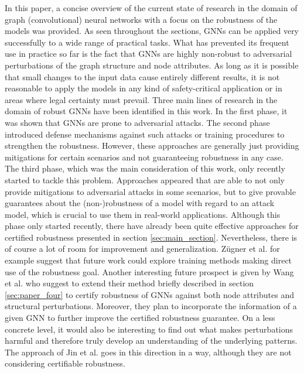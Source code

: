 \documentclass[a4paper,preprint]{sig-alternate}
\begin{document}
In this paper, a concise overview of the current state of research in the domain of graph (convolutional) neural networks with a focus on the robustness 
of the models was provided. As seen throughout the sections, GNNs can be applied very successfully to a wide range of practical tasks.
What has prevented its frequent use in practice so far is the fact that GNNs are highly non-robust to adversarial perturbations of the graph structure
and node attributes. As long as it is possible that small changes to the input data cause entirely different results, it is not reasonable to
apply the models in any kind of safety-critical application or in areas where legal certainty must prevail.\newline
Three main lines of research in the domain of robust GNNs have been identified in this work. In the first phase, it was shown that GNNs are prone to adversarial attacks.
The second phase introduced defense mechanisms against such attacks or training procedures to strengthen the robustness. However, these approaches
are generally just providing mitigations for certain scenarios and not guaranteeing robustness in any case.
The third phase, which was the main consideration of this work, only recently started to tackle this problem. 
Approaches appeared that are able to not only provide mitigations to adversarial attacks in some scenarios, but to give provable guarantees about 
the (non-)robustness of a model with regard to an attack model, which is crucial to use them in real-world applications.\newline
Although this phase only started recently, there have already been quite effective approaches for certified robustness presented in section \ref{sec:main_section}.
Nevertheless, there is of course a lot of room for improvement and generalization.
Zügner et al. \cite{10.1145/3394486.3403217} for example suggest that future work could explore training methods making direct use of the robustness goal.
Another interesting future prospect is given by Wang et al. \cite{trivedi2017knowevolve} who suggest to extend their method briefly described in 
section \ref{sec:paper_four} to certify robustness of GNNs against both node attributes and structural perturbations.
Moreover, they plan to incorporate the information of a given GNN to further improve the certified robustness guarantee.\newline
On a less concrete level, it would also be interesting to find out what makes perturbations harmful and therefore
truly develop an understanding of the underlying patterns.
The approach of Jin et al. \cite{Jin_2020_Graph} goes in this direction in a way, although they are not considering certifiable robustness.
\end{document}
